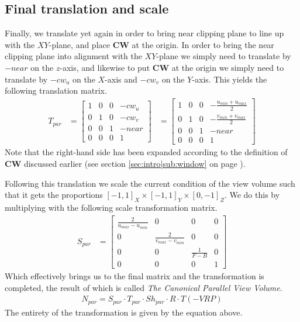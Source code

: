 \documentclass[11pt]{article}
\newcommand{\secref}[1]{see section \ref{#1} on page \pageref{#1}}
\begin{document}
\subsection{Final translation and scale}
\label{sec:canonical-parallel-view-volume|sub:translate-and-scale}
Finally, we translate yet again in order to bring near clipping plane to line
up with the $XY$-plane, and place {\bf CW} at the origin. In order to bring
the near clipping plane into alignment with the $XY$-plane we simply need to
translate by $-near$ on the $z$-axis, and likewise to put {\bf CW} at the
origin we simply need to translate by $-cw_u$ on the $X$-axis and $-cw_v$ on
the $Y$-axis. This yields the following translation matrix.
\begin{align}
    T_{par} &=
    \begin{bmatrix}
        1 & 0 & 0 & -cw_u \\
        0 & 1 & 0 & -cw_v \\
        0 & 0 & 1 & -near \\
        0 & 0 & 0 & 1
    \end{bmatrix}
    &=
    \begin{bmatrix}
        1 & 0 & 0 & -\frac{u_{min} + u_{max}}{2} \\
        0 & 1 & 0 & -\frac{v_{min} + v_{max}}{2} \\
        0 & 0 & 1 & -near \\
        0 & 0 & 0 & 1
    \end{bmatrix}
\end{align}
Note that the right-hand side has been expanded according to the definition of
{\bf CW} discussed earlier (\secref{sec:intro|sub:window}).

Following this translation we scale the current condition of the view volume
such that it gets the proportions $[-1, 1]_X \times [-1, 1]_Y \times
[0, -1]_Z$. We do this by multiplying with the following scale transformation
matrix.
\begin{align}
    S_{par} &=
    \begin{bmatrix}
        \frac{2}{u_{max} - u_{min}} & 0 & 0 & 0 \\
        0 & \frac{2}{v_{max} - v_{min}} & 0 & 0 \\
        0 & 0 & \frac{1}{F - B} & 0 \\
        0 & 0 & 0 & 1
    \end{bmatrix}
\end{align}
Which effectively brings us to the final matrix and the transformation is
completed, the result of which is called {\it The Canonical Parallel View
Volume}.
\begin{align}
    N_{par} = S_{par} \cdot T_{par} \cdot Sh_{par} \cdot R \cdot T(-VRP)
\end{align}
The entirety of the transformation is given by the equation above.
\end{document}
